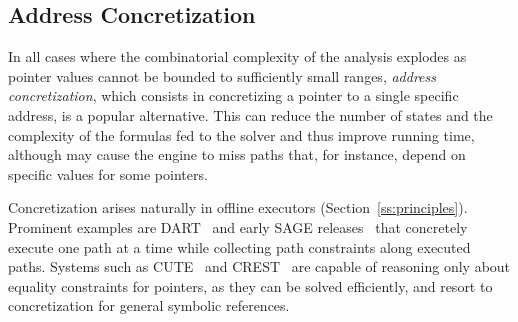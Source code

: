 
\subsection{Address Concretization}
\label{ss:address-concretization}

In all cases where the combinatorial complexity of the analysis explodes as pointer values cannot be bounded to sufficiently small ranges, {\em address concretization}, which consists in concretizing a pointer to a single specific address, is a popular alternative. This can reduce the number of states and the complexity of the formulas fed to the solver and thus improve running time, although may cause the engine to miss paths that, for instance, depend on specific values for some pointers. 

Concretization arises naturally in offline executors (Section~\ref{ss:principles}). Prominent examples are {\sc DART}~\cite{DART-PLDI05} and early {\sc SAGE} releases~\cite{SAGE-NDSS08} that concretely execute one path at a time while collecting path constraints along executed paths. %
Systems such as {\sc CUTE}~\cite{CUTE-FSE05} and {\sc CREST}~\cite{CREST-ASE08} are capable of reasoning only about equality constraints for pointers, as they can be solved efficiently, and resort to concretization for general symbolic references. %




